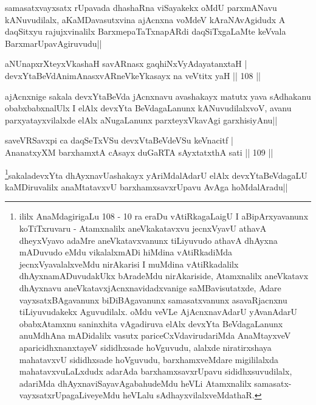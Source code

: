 \begin{artha}
samasatxvayxsatx rUpavada dhashaRna viSayakekx oMdU parxmANavu kANuvudilalx, aKaMDavasutxvina ajAcnxna voMdeV kAraNAvAgidudx A daqSitxyu rajujxvinalilx BarxmepaTaTxnapARdi daqSiTxgaLaMte keVvala BarxmarUpavAgiruvudu||
\end{artha}


\begin{shl}
aNUnapxrXteyxVkashaH savARnasx gaqhiNxVyAdayatanxtaH |\\
devxYtaBeVdAnimAnasxvARneVkeYkasayx na veVtitx yaH \hfill || 108 ||
\end{shl}

\begin{artha}
ajAcnxnige sakala devxYtaBeVda jAcnxnavu avashakayx matutx yava sAdhakanu obabxbabxnalUlx I elAlx devxYta BeVdagaLanunx kANuvudilalxvoV, avanu parxyatayxvilalxde elAlx aNugaLanunx parxteyxVkavAgi garxhisiyAnu||
\end{artha}


\begin{shl}
saveVRSavxpi ca daqSeTxVSu devxVtaBeVdeVSu keVnacitf |\\
AnanatxyXM barxhamxtA cAsayx duGaRTA sAyxtatxthA sati \hfill || 109 ||
\end{shl}

\begin{artha}
\footnote{ililx AnaMdagirigaLu 108 - 10 ra eraDu vAtiRkagaLaigU I aBipArxyavanunx koTiTxruvaru - Atamxnalilx aneVkakatavxvu jecnxVyavU athavA dheyxVyavo adaMre aneVkatavxvanunx tiLiyuvudo athavA dhAyxna mADuvudo eMdu vikalalxmADi hiMdina vAtiRkadiMda jecnxVyavalalxveMdu nirAkarisi I muMdina vAtiRkadalilx dhAyxnamADuvudakUkx bAradeMdu nirAkariside, Atamxnalilx aneVkatavx dhAyxnavu aneVkatavxjAcnxnavidadxvanige saMBavisutatxde, Adare vayxsatxBAgavanunx biDiBAgavanunx samasatxvanunx asavaRjacnxnu tiLiyuvudakekx Aguvudilalx. oMdu veVLe AjAcnxnavAdarU yAvanAdarU obabxAtamxnu saninxhita vAgadiruva elAlx devxYta BeVdagaLanunx anuMdhAna mADidalilx vasutx pariceCxVdavirudariMda AnaMtayxveV aparicidhxnanxtayeV sididhxsade hoVguvudu, alalxde niratirxshaya mahatavxvU sididhxsade hoVguvudu, barxhamxveMdare migililalxda mahatavxvuLaLxdudx adarAda barxhamxsavxrUpavu sididhxsuvudilalx, adariMda dhAyxnaviSayavAgabahudeMdu heVLi Atamxnalilx samasatx-vayxsatxrUpagaLiveyeMdu heVLalu sAdhayxvilalxveMdathaR.}sakaladevxYta dhAyxnavUashakayx yAriMdalAdarU elAlx devxYtaBeVdagaLU kaMDiruvalilx anaMtatavxvU barxhamxsavxrUpavu AvAga hoMdalAradu||
\end{artha}

